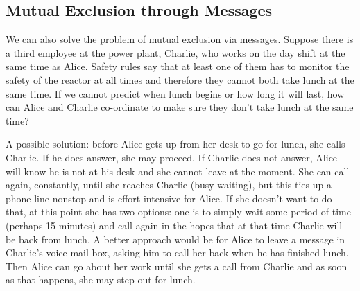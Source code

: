 \subsection*{Mutual Exclusion through Messages}

We can also solve the problem of mutual exclusion via messages. Suppose there is a third employee at the power plant, Charlie, who works on the day shift at the same time as Alice. Safety rules say that at least one of them has to monitor the safety of the reactor at all times and therefore they cannot both take lunch at the same time. If we cannot predict when lunch begins or how long it will last, how can Alice and Charlie co-ordinate to make sure they don't take lunch at the same time?

A possible solution: before Alice gets up from her desk to go for lunch, she calls Charlie. If he does answer, she may proceed. If Charlie does not answer, Alice will know he is not at his desk and she cannot leave at the moment. She can call again, constantly, until she reaches Charlie (busy-waiting), but this ties up a phone line nonstop and is effort intensive for Alice. If she doesn't want to do that, at this point she has two options: one is to simply wait some period of time (perhaps 15 minutes) and call again in the hopes that at that time Charlie will be back from lunch. A better approach would be for Alice to leave a message in Charlie's voice mail box, asking him to call her back when he has finished lunch. Then Alice can go about her work until she gets a call from Charlie and as soon as that happens, she may step out for lunch.





